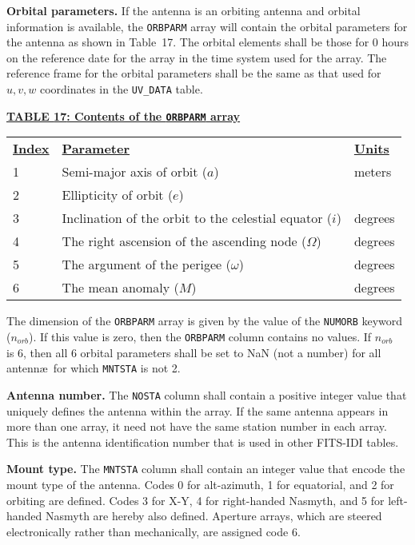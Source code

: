 \documentclass[twoside]{article}
\newcommand{\Hi}[1]{\textcolor{hicol}{#1}}
\newcommand{\Me}[1]{\textcolor{mecol}{#1}}
\newcommand{\norb}{$n_{orb}$}
\begin{document}
{\bf Orbital parameters.} If the antenna is an orbiting antenna and
orbital information is available, the {\tt ORBPARM} array will
contain the orbital parameters for the antenna as shown in
Table~\Hi{17}.  The orbital elements shall be those for 0 hours on the
reference date for the array in the time system used for the array.
The reference frame for the orbital parameters shall be the same as
that used for $u,v,w$ coordinates in the {\tt UV\_DATA} table.
\begin{center}

\underline{\bf{TABLE \Hi{17}: Contents of the {\tt ORBPARM} array}} \\
\begin{tabular}{lll}
\noalign{\vspace{2pt}}
\underline{{\bf Index\vphantom{y}}} &
   \underline{\bf{Parameter\vphantom{y}}} &
   \underline{{\bf Units\vphantom{y}}} \\
\noalign{\vspace{2pt}}
1  & Semi-major axis of orbit ($a$) & meters \\
2  & Ellipticity of orbit ($e$)          &  \\
3  & Inclination of the orbit to the celestial equator ($i$) & degrees \\
4  & The right ascension of the ascending node ($\Omega$)  & degrees \\
5  & The argument of the perigee ($\omega$)  & degrees \\
6  & The mean anomaly ($M$)  & degrees
\end{tabular}
\end{center}

The dimension of the {\tt ORBPARM} array is given by the \Hi{value of}
the {\tt NUMORB} keyword \Hi{(\norb)}.  If this value is zero, then
the {\tt ORBPARM} column contains no values.  If \Hi{\norb\ } is 6,
then all 6 orbital parameters shall be set to NaN \Hi{(not a number)}
for all antenn\ae\ for which {\tt MNTSTA} is not 2.

{\bf \Hi{Antenna} number.} The {\tt NOSTA} column shall contain a
positive integer value that uniquely defines the antenna within the
array.  If the same antenna appears in more than one array, it need
not have the same station number in each array.  This is the antenna
identification number that is used in other FITS-IDI tables.

{\bf Mount type.} The {\tt MNTSTA} column shall contain an integer
value that encode the mount type of the antenna.  \Hi{Codes 0 for
alt-azimuth, 1 for equatorial, and 2 for orbiting are
defined.  Codes 3 for X-Y, 4 for right-handed Nasmyth, and 5 for
left-handed Nasmyth are hereby also defined.}  \Me{Aperture arrays,
  which are steered electronically rather than mechanically, are
  assigned code 6.}
\end{document}
